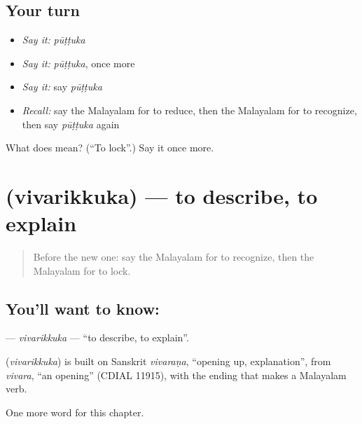 \subsection*{Your turn}
\begin{itemize}
\raggedright
  \item \emph{Say it:} \emph{pūṭṭuka}
  \item \emph{Say it:} \emph{pūṭṭuka}, once more
  \item \emph{Say it:} say \emph{pūṭṭuka}
  \item \emph{Recall:} say the Malayalam for to reduce, then the Malayalam for to recognize, then say \emph{pūṭṭuka} again
\end{itemize}

\begin{tcolorbox}[breakable,colback=teal!4,colframe=teal!35!black,title={Before you move on}]
What does  mean? (\textquotedblleft{}To lock\textquotedblright{}.) Say it once more.
\end{tcolorbox}
\section[\texorpdfstring{\ml{വിവരിക്കുക} (vivarikkuka)}{വിവരിക്കുക (vivarikkuka)}]{ (vivarikkuka) — to describe, to explain}

\label{lesson:ML-C309-vivarikkuka}



\begin{quote}
Before the new one: say the Malayalam for to recognize, then the Malayalam for to lock.
\end{quote}

\subsection*{You'll want to know: }
\textbf{} — \emph{vivarikkuka} — \textquotedblleft{}to describe, to explain\textquotedblright{}.

\begin{cousinweb}
\textbf{} (\emph{vivarikkuka}) is built on Sanskrit \emph{vivaraṇa}, \textquotedblleft{}opening up, explanation\textquotedblright{}, from \emph{vivara}, \textquotedblleft{}an opening\textquotedblright{} (CDIAL 11915), with the ending that makes a Malayalam verb.
\end{cousinweb}

\begin{grammarlens}[title={What you've built}]
One more word for this chapter.
\end{grammarlens}

